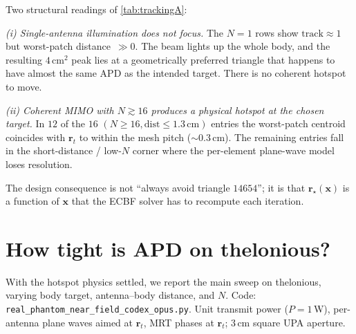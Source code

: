 \documentclass[journal]{IEEEtran}
\newcommand{\rr}{\bm{r}}
\newcommand{\xx}{\bm{x}}
\begin{document}
Two structural readings of \cref{tab:trackingA}:

\emph{(i) Single-antenna illumination does not focus.} The $N\!=\!1$
rows show $\mathrm{track}\!\approx\!1$ but worst-patch
distance~$\!\gg\!0$. The beam lights up the whole body, and the
resulting $4\,\mathrm{cm}^2$ peak lies at a geometrically preferred
triangle that happens to have almost the same APD as the intended
target. There is no coherent hotspot to move.

\emph{(ii) Coherent MIMO with $N\!\gtrsim\!16$ produces a physical
hotspot at the chosen target.} In $12$ of the $16$ $(N\!\ge\!16,
\mathrm{dist}\le 1.3\,\mathrm{cm})$ entries the worst-patch centroid
coincides with $\rr_t$ to within the mesh pitch ($\sim\!0.3$\,cm).
The remaining entries fall in the short-distance / low-$N$ corner
where the per-element plane-wave model loses resolution.

The design consequence is not ``always avoid triangle $14654$'';
it is that $\rr_\star(\xx)$ is a function of $\xx$ that the ECBF
solver has to recompute each iteration.

\section{How tight is APD on thelonious?}\label{sec:thelonious}

With the hotspot physics settled, we report the main sweep on
thelonious, varying body target, antenna--body distance, and $N$.
Code: \verb|real_phantom_near_field_codex_opus.py|. Unit transmit
power ($P\!=\!1$\,W), per-antenna plane waves aimed at $\rr_t$,
MRT phases at $\rr_t$; $3\,\mathrm{cm}$ square UPA aperture.
\end{document}
